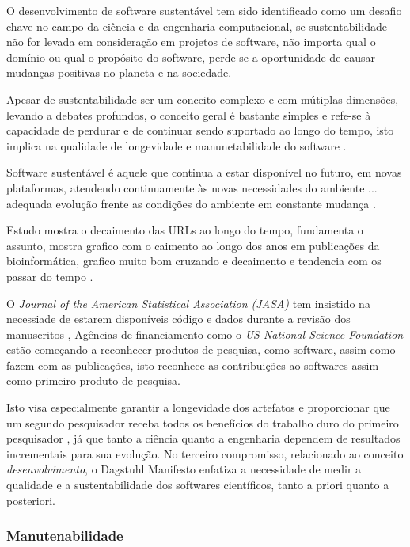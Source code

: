 O desenvolvimento de software sustentável tem sido identificado como um desafio
chave no campo da ciência e da engenharia computacional, se sustentabilidade
não for levada em consideração em projetos de software, não importa qual o
domínio ou qual o propósito do software, perde-se a oportunidade de causar
mudanças positivas no planeta e na sociedade.

Apesar de sustentabilidade ser um conceito complexo e com mútiplas dimensões,
levando a debates profundos, o conceito geral é bastante simples e refe-se à
capacidade de perdurar e de continuar sendo suportado ao longo do tempo, isto
implica na qualidade de longevidade e manunetabilidade do software
\cite{venters2014software}.

Software sustentável é aquele que continua a estar disponível no futuro, em
novas plataformas, atendendo continuamente às novas necessidades do ambiente
... adequada evolução frente as condições do ambiente em constante mudança
\cite{allen2017engineering}.

Estudo mostra o decaimento das URLs ao longo do tempo, fundamenta o assunto,
mostra grafico com o caimento ao longo dos anos em publicações da
bioinformática, grafico muito bom cruzando e decaimento e tendencia com os
passar do tempo \cite{wren2017use}.

O {\it Journal of the American Statistical Association (JASA)} tem insistido na
necessiade de estarem disponíveis código e dados durante a revisão dos
manuscritos \cite{baker2016scientists}, Agências de financiamento como o {\it
US National Science Foundation} estão começando a reconhecer produtos de
pesquisa, como software, assim como fazem com as publicações, isto reconhece as
contribuições ao softwares assim como primeiro produto de pesquisa.

Isto visa especialmente garantir a longevidade dos artefatos e proporcionar que
um segundo pesquisador receba todos os benefícios do trabalho duro do primeiro
pesquisador \cite{king1995replication}, já que tanto a ciência quanto a
engenharia dependem de resultados incrementais para sua evolução. No terceiro
compromisso, relacionado ao conceito {\it desenvolvimento}, o Dagstuhl
Manifesto enfatiza a necessidade de medir a qualidade e a sustentabilidade dos
softwares científicos, tanto a priori quanto a posteriori.

\subsubsection{Manutenabilidade}

